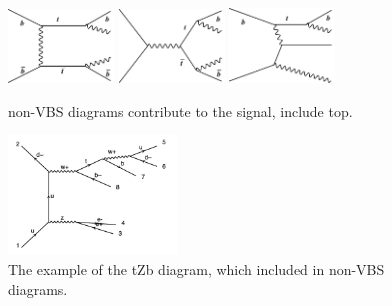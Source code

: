 

\begin{figure}[H]
\begin{center}
 \includegraphics[width=0.25\textwidth,keepaspectratio]{figures/samples/feynEWKnonVBS1.pdf}
 \includegraphics[width=0.25\textwidth,keepaspectratio]{figures/samples/feynEWKnonVBS2.pdf}
 \includegraphics[width=0.25\textwidth,keepaspectratio]{figures/samples/feynEWKnonVBS7.pdf}
 \caption[f]{
non-VBS diagrams contribute to the signal, include top.
}
\label{fig:feynmanEWKnonVBS2}
\end{center}
\end{figure}

\begin{figure}[H]
\begin{center}
\includegraphics[width=0.4\textwidth,keepaspectratio]{figures/samples/feynEWKnonVBStZb.pdf}
\caption{
The example of the tZb diagram, which included in non-VBS diagrams.
}
\label{fig:feynmantZb}
\end{center}
\end{figure}

